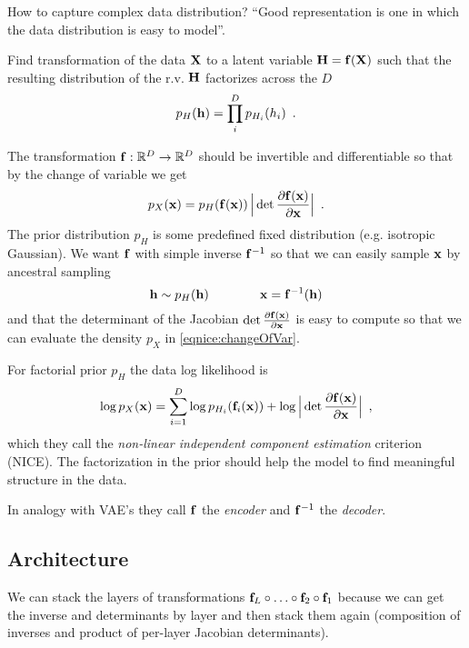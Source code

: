 How to capture complex data distribution?
``Good representation is one in which the data distribution is easy to model''.

Find transformation of the data $\mathbf{X}$ to a latent variable $\mathbf{H} = \mathbf{f}(\mathbf{X})$ such that the resulting distribution of the r.v. $\mathbf{H}$ factorizes across the $D$
\begin{equation}
p_{H}(\mathbf{h}) = \prod_i^D p_{H_i}(h_i) \enspace .
\end{equation}

The transformation $\mathbf{f} : \mathbb{R}^D \to \mathbb{R}^D$ should be invertible and differentiable so that by the change of variable we get
\begin{equation}\label{eqnice:changeOfVar}
p_X(\mathbf{x}) = p_H(\mathbf{f}(\mathbf{x})) \,\Big\lvert \det \frac{\partial \mathbf{f}(\mathbf{x})}{\partial \mathbf{x}} \Big\rvert \enspace .
\end{equation}
The prior distribution $p_H$ is some predefined fixed distribution (e.g. isotropic Gaussian).
We want $\mathbf{f}$ with simple inverse $\mathbf{f}^{-1}$ so that we can easily sample $\mathbf{x}$ by ancestral sampling
\begin{equation}
\mathbf{h} \sim p_{H}(\mathbf{h}) \qquad \qquad
\mathbf{x} = \mathbf{f}^{-1}(\mathbf{h})
\end{equation}
and that the determinant of the Jacobian $\det \frac{\partial \mathbf{f}(\mathbf{x})}{\partial \mathbf{x}}$ is easy to compute so that we can evaluate the density $p_X$ in \eqref{eqnice:changeOfVar}.

For factorial prior $p_H$ the data log likelihood is
\begin{equation}\label{eqnice:logLike}
\log p_X(\mathbf{x}) = \sum_{i=1}^D \log p_{H_i}(\mathbf{f}_i(\mathbf{x})) + \log \Big\lvert \det \frac{\partial \mathbf{f}(\mathbf{x})}{\partial \mathbf{x}} \Big\rvert \enspace ,
\end{equation}
which they call the \emph{non-linear independent component estimation} criterion (NICE).
The factorization in the prior should help the model to find meaningful structure in the data.

In analogy with VAE's they call $\mathbf{f}$ the \emph{encoder} and $\mathbf{f}^{-1}$ the \emph{decoder}.

\subsection{Architecture}

We can stack the layers of  transformations $\mathbf{f}_L \circ \ldots \circ \mathbf{f}_2 \circ \mathbf{f}_1$ because we can get the inverse and determinants by layer and then stack them again (composition of inverses and product of per-layer Jacobian determinants).

